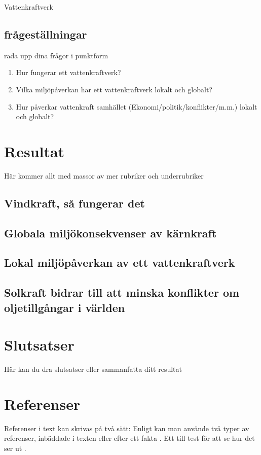 \documentclass[11p]{article}
\begin{document}
Vattenkraftverk

 \subsection{frågeställningar}
 rada upp dina frågor i punktform
 \begin{enumerate}
  \item Hur fungerar ett vattenkraftverk?
  \item Vilka miljöpåverkan har ett vattenkraftverk lokalt och globalt?
  \item Hur påverkar vattenkraft samhället (Ekonomi/politik/konflikter/m.m.) lokalt och globalt?
 \end{enumerate}

 \section{Resultat}
 Här kommer allt med massor av mer rubriker och underrubriker
 \subsection{Vindkraft, så fungerar det}
 \subsection{Globala miljökonsekvenser av kärnkraft}
 \subsection{Lokal miljöpåverkan av ett vattenkraftverk}
 \subsection{Solkraft bidrar till att minska konflikter om oljetillgångar i världen}
 \subsection{}

 \section{Slutsatser}
 Här kan du dra slutsatser eller sammanfatta ditt resultat


 \section{Referenser}
 Referenser i text kan skrivas på två sätt: Enligt \textcite{Jens} kan man använde två typer av referenser, inbäddade i texten eller efter ett fakta \parencite{Fraenkel}. Ett till test för att se hur det ser ut \parencite[sid 55]{fermi}.
\end{document}
